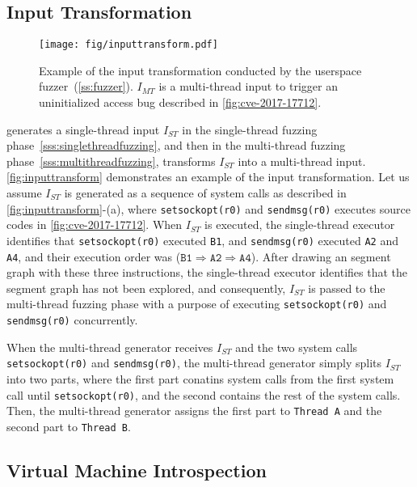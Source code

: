 \subsection{Input Transformation}
\label{s:appendix:inputtransform}


\begin{figure}[h]
  \centering
  \texttt{[image: fig/inputtransform.pdf]}
  \caption{Example of the input transformation conducted by the
    userspace fuzzer~(\autoref{ss:fuzzer}). $I_{MT}$ is a multi-thread
    input to trigger an uninitialized access bug described in
    \autoref{fig:cve-2017-17712}.}
  \label{fig:inputtransform}
\end{figure}

\sys generates a single-thread input $I_{ST}$ in the single-thread
fuzzing phase~\autoref{sss:singlethreadfuzzing}, and then in the
multi-thread fuzzing phase~\autoref{sss:multithreadfuzzing},
transforms $I_{ST}$ into a multi-thread input.
%
\autoref{fig:inputtransform} demonstrates an example of the input
transformation. Let us assume $I_{ST}$ is generated as a sequence of
system calls as described in \autoref{fig:inputtransform}-(a), where
\texttt{setsockopt(r0)} and \texttt{sendmsg(r0)} executes source codes
in \autoref{fig:cve-2017-17712}. When $I_{ST}$ is executed, the
single-thread executor identifies that \texttt{setsockopt(r0)}
executed \texttt{B1}, and \texttt{sendmsg(r0)} executed \texttt{A2}
and \texttt{A4}, and their execution order was
($\texttt{B1} \Rightarrow \texttt{A2} \Rightarrow \texttt{A4}$).
%
After drawing an segment graph with these three instructions, the
single-thread executor identifies that the segment graph has not been
explored, and consequently, $I_{ST}$ is passed to the multi-thread
fuzzing phase with a purpose of executing \texttt{setsockopt(r0)} and
\texttt{sendmsg(r0)} concurrently.


When the multi-thread generator receives $I_{ST}$ and the two system
calls \texttt{setsockopt(r0)} and \texttt{sendmsg(r0)}, the
multi-thread generator simply splits $I_{ST}$ into two parts, where
the first part conatins system calls from the first system call until
\texttt{setsockopt(r0)}, and the second contains the rest of the
system calls. Then, the multi-thread generator assigns the first part
to \texttt{Thread~A} and the second part to \texttt{Thread~B}.


\dr{}

\subsection{Virtual Machine Introspection}
\label{s:appendix:vmi}

